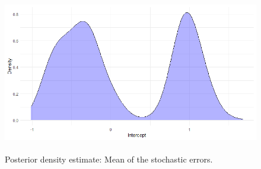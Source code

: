\begin{enumerate}[leftmargin=*]
\begin{figure}[!h]
	\includegraphics[width=340pt, height=200pt]{Chapters/chapter11/figures/DMPSemi.png}
	\caption[List of figure caption goes here]{Posterior density estimate: Mean of the stochastic errors.}\label{figDMPSemi}
\end{figure}


\end{enumerate}